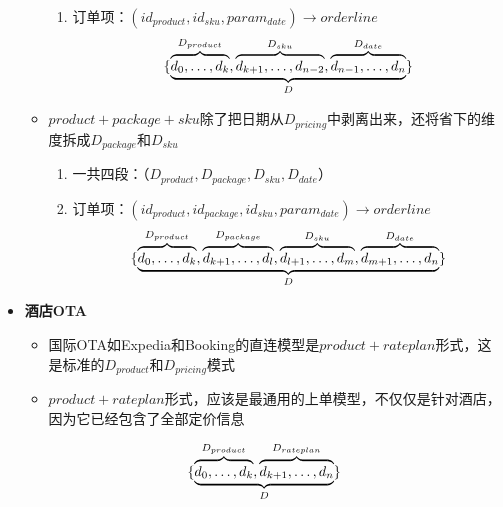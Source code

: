 \documentclass[a4paper]{article}
\begin{document}
\begin{itemize}
\begin{itemize}
\begin{enumerate}
                \item 订单项：$(id_{product}, id_{sku}, param_{date}) \longrightarrow orderline$
                \begin{equation}
                    \{\underbrace{%
                        \overbrace{\mathstrut d_0,\ldots,d_k}^{D_{product}},
                        \overbrace{\mathstrut d_{k+1},\ldots,d_{n-2}}^{D_{sku}},
                        \overbrace{\mathstrut d_{n-1},\ldots,d_n}^{D_{date}}
                    }
                    _{D} \}
                \end{equation}                        
            \end{enumerate}
            \item $product+package+sku$除了把日期从$D_{pricing}$中剥离出来，还将省下的维度拆成$D_{package}$和$D_{sku}$
            \begin{enumerate}      
                \item 一共四段：（$D_{product}, D_{package}, D_{sku}, D_{date}$）
                \item 订单项：$(id_{product}, id_{package}, id_{sku}, param_{date}) \longrightarrow orderline$ 
                \begin{equation}
                    \{\underbrace{%
                        \overbrace{\mathstrut d_0,\ldots,d_k}^{D_{product}},
                        \overbrace{\mathstrut d_{k+1},\ldots,d_l}^{D_{package}},                        
                        \overbrace{\mathstrut d_{l+1},\ldots,d_m}^{D_{sku}},
                        \overbrace{\mathstrut d_{m+1},\ldots,d_n}^{D_{date}}
                    }
                    _{D} \}
                \end{equation}  
            \end{enumerate}
        \end{itemize}
    \item \textbf{酒店OTA}
        \begin{itemize}
            \item 国际OTA如Expedia和Booking的直连模型是$product+rateplan$形式，这是标准的$D_{product}$和$D_{pricing}$模式
            \item $product+rateplan$形式，应该是最通用的上单模型，不仅仅是针对酒店，因为它已经包含了全部定价信息
        \end{itemize}
        \begin{equation}
            \{\underbrace{%
                \overbrace{\mathstrut d_0,\ldots,d_k}^{D_{product}},
                \overbrace{\mathstrut d_{k+1},\ldots,d_n}^{D_{rateplan}}
            }
            _{D} \}
        \end{equation}   
\end{itemize}
\end{document}

